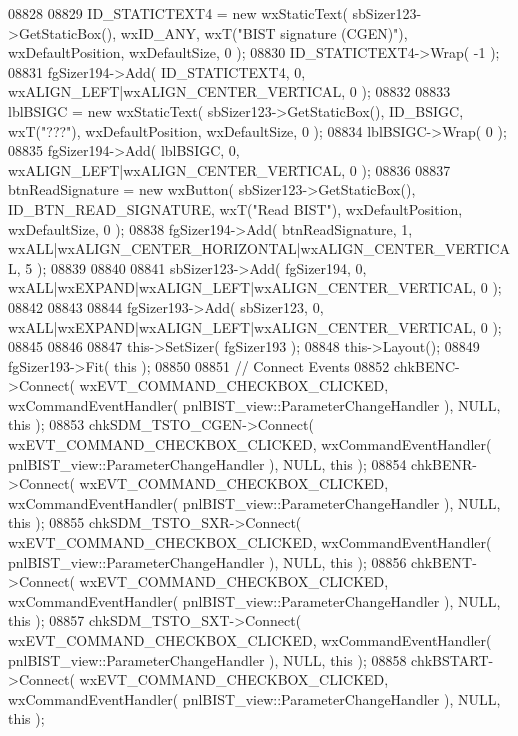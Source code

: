 \begin{DoxyCode}
08828     
08829     ID_STATICTEXT4 = \textcolor{keyword}{new} wxStaticText( sbSizer123->GetStaticBox(), wxID\_ANY, wxT(\textcolor{stringliteral}{"BIST signature (CGEN)"}), 
      wxDefaultPosition, wxDefaultSize, 0 );
08830     ID_STATICTEXT4->Wrap( -1 );
08831     fgSizer194->Add( ID_STATICTEXT4, 0, wxALIGN\_LEFT|wxALIGN\_CENTER\_VERTICAL, 0 );
08832     
08833     lblBSIGC = \textcolor{keyword}{new} wxStaticText( sbSizer123->GetStaticBox(), ID_BSIGC, wxT(\textcolor{stringliteral}{"???"}), wxDefaultPosition, 
      wxDefaultSize, 0 );
08834     lblBSIGC->Wrap( 0 );
08835     fgSizer194->Add( lblBSIGC, 0, wxALIGN\_LEFT|wxALIGN\_CENTER\_VERTICAL, 0 );
08836     
08837     btnReadSignature = \textcolor{keyword}{new} wxButton( sbSizer123->GetStaticBox(), 
      ID_BTN_READ_SIGNATURE, wxT(\textcolor{stringliteral}{"Read BIST"}), wxDefaultPosition, wxDefaultSize, 0 );
08838     fgSizer194->Add( btnReadSignature, 1, wxALL|wxALIGN\_CENTER\_HORIZONTAL|wxALIGN\_CENTER\_VERTICAL, 5 );
08839     
08840     
08841     sbSizer123->Add( fgSizer194, 0, wxALL|wxEXPAND|wxALIGN\_LEFT|wxALIGN\_CENTER\_VERTICAL, 0 );
08842     
08843     
08844     fgSizer193->Add( sbSizer123, 0, wxALL|wxEXPAND|wxALIGN\_LEFT|wxALIGN\_CENTER\_VERTICAL, 0 );
08845     
08846     
08847     this->SetSizer( fgSizer193 );
08848     this->Layout();
08849     fgSizer193->Fit( \textcolor{keyword}{this} );
08850     
08851     \textcolor{comment}{// Connect Events}
08852     chkBENC->Connect( wxEVT\_COMMAND\_CHECKBOX\_CLICKED, wxCommandEventHandler( 
      pnlBIST_view::ParameterChangeHandler ), NULL, \textcolor{keyword}{this} );
08853     chkSDM_TSTO_CGEN->Connect( wxEVT\_COMMAND\_CHECKBOX\_CLICKED, wxCommandEventHandler( 
      pnlBIST_view::ParameterChangeHandler ), NULL, \textcolor{keyword}{this} );
08854     chkBENR->Connect( wxEVT\_COMMAND\_CHECKBOX\_CLICKED, wxCommandEventHandler( 
      pnlBIST_view::ParameterChangeHandler ), NULL, \textcolor{keyword}{this} );
08855     chkSDM_TSTO_SXR->Connect( wxEVT\_COMMAND\_CHECKBOX\_CLICKED, wxCommandEventHandler( 
      pnlBIST_view::ParameterChangeHandler ), NULL, \textcolor{keyword}{this} );
08856     chkBENT->Connect( wxEVT\_COMMAND\_CHECKBOX\_CLICKED, wxCommandEventHandler( 
      pnlBIST_view::ParameterChangeHandler ), NULL, \textcolor{keyword}{this} );
08857     chkSDM_TSTO_SXT->Connect( wxEVT\_COMMAND\_CHECKBOX\_CLICKED, wxCommandEventHandler( 
      pnlBIST_view::ParameterChangeHandler ), NULL, \textcolor{keyword}{this} );
08858     chkBSTART->Connect( wxEVT\_COMMAND\_CHECKBOX\_CLICKED, wxCommandEventHandler( 
      pnlBIST_view::ParameterChangeHandler ), NULL, \textcolor{keyword}{this} );

\end{DoxyCode}
